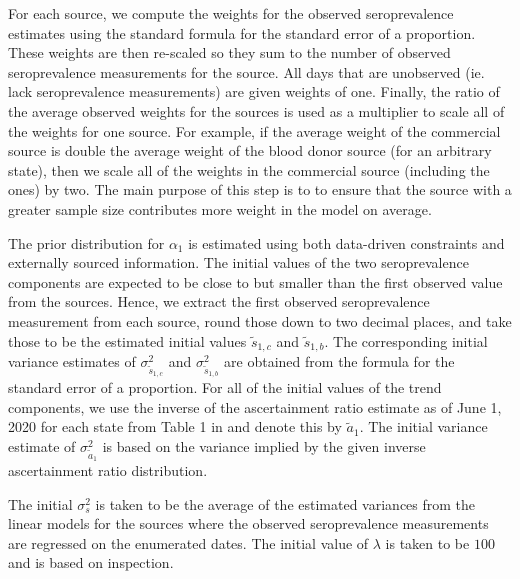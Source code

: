 \documentclass{article}
\begin{document}
For each source, we compute the weights for the observed seroprevalence
estimates using the standard formula for the standard error of a proportion.
These weights are then re-scaled so they sum to the number of observed
seroprevalence measurements for the source. All days that are unobserved (ie.
lack seroprevalence measurements) are given weights of one. Finally, the ratio
of the average observed weights for the sources is used as a multiplier to scale
all of the weights for one source. For example, if the average weight of the
commercial source is double the average weight of the blood donor source (for an
arbitrary state), then we scale all of the weights in the commercial source
(including the ones) by two. The main purpose of this step is to to ensure that
the source with a greater sample size contributes more weight in the model on
average. %

The prior distribution for $\alpha_1$ is estimated using both data-driven constraints 
and externally sourced information. The initial values of the two seroprevalence 
components are expected to be close to
but smaller than the first observed value from the sources. Hence, we
extract the first observed seroprevalence measurement from each source, round
those down to two decimal places, and take those to be the estimated initial
values $\tilde{s}_{1,c}$ and $\tilde{s}_{1,b}$. The corresponding initial
variance estimates of $\sigma^2_{\tilde{s}_{1,c}}$ and
$\sigma^2_{\tilde{s}_{1,b}}$ are obtained from the formula for the standard
error of a proportion. For all of the initial values of the trend components, 
 we use the inverse of the ascertainment ratio estimate as of June 1, 2020 for each state
from Table 1 in \citet{unwin2020state} and denote this by $\tilde{a}_1$. The
initial variance estimate of $\sigma^2_{\tilde{a}_1}$ is based on the variance implied 
by the given inverse ascertainment ratio distribution.

The initial $\sigma^2_s$ is taken to be the average of the estimated variances
from the linear models for the sources where the observed seroprevalence
measurements are regressed on the enumerated dates. The initial value of
$\lambda$ is taken to be $100$ and is based on inspection.  
\end{document}
